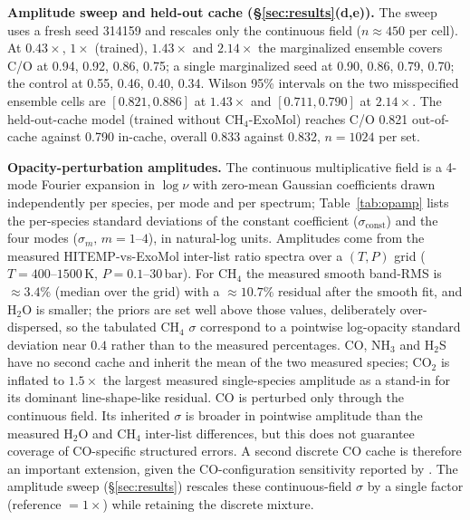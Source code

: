 \documentclass{article}
\begin{document}
\textbf{Amplitude sweep and held-out cache (\S\ref{sec:results}(d,e)).} The
sweep uses a fresh seed 314159 and rescales only the continuous field
($n\!\approx\!450$ per cell). At $0.43\times$, $1\times$ (trained), $1.43\times$
and $2.14\times$ the marginalized ensemble covers C/O at 0.94, 0.92, 0.86, 0.75;
a single marginalized seed at 0.90, 0.86, 0.79, 0.70; the control at 0.55, 0.46,
0.40, 0.34. Wilson 95\% intervals on the two misspecified ensemble cells are
$[0.821,0.886]$ at $1.43\times$ and $[0.711,0.790]$ at $2.14\times$. The
held-out-cache model (trained without CH$_4$-ExoMol) reaches C/O 0.821
out-of-cache against 0.790 in-cache, overall 0.833 against 0.832, $n=1024$ per
set.

\textbf{Opacity-perturbation amplitudes.} The continuous multiplicative field is
a 4-mode Fourier expansion in $\log\nu$ with zero-mean Gaussian coefficients
drawn independently per species, per mode and per spectrum;
Table~\ref{tab:opamp} lists the per-species standard deviations of the constant
coefficient ($\sigma_{\mathrm{const}}$) and the four modes
($\sigma_{m},\,m=1$--$4$), in natural-log units. Amplitudes come from the
measured HITEMP-vs-ExoMol inter-list ratio spectra over a $(T,P)$ grid
($T=400$--$1500$\,K, $P=0.1$--$30$\,bar). For CH$_4$ the measured smooth
band-RMS is $\approx3.4\%$ (median over the grid) with a $\approx10.7\%$
residual after the smooth fit, and H$_2$O is smaller; the priors are set well
above those values, deliberately over-dispersed, so the tabulated CH$_4$
$\sigma$ correspond to a pointwise log-opacity standard deviation near $0.4$
rather than to the measured percentages. CO, NH$_3$ and H$_2$S have no second
cache and inherit the mean of the two measured species; CO$_2$ is inflated to
$1.5\times$ the largest measured single-species amplitude as a stand-in for its
dominant line-shape-like residual. CO is perturbed only through the continuous
field. Its inherited $\sigma$ is broader in pointwise amplitude than the
measured H$_2$O and CH$_4$ inter-list differences, but this does not guarantee
coverage of CO-specific structured errors. A second discrete CO cache is
therefore an important extension, given the CO-configuration sensitivity
reported by \citet{yama2026}. The amplitude sweep
(\S\ref{sec:results}) rescales these continuous-field $\sigma$ by a single
factor (reference $=1\times$) while retaining the discrete mixture.
\end{document}
